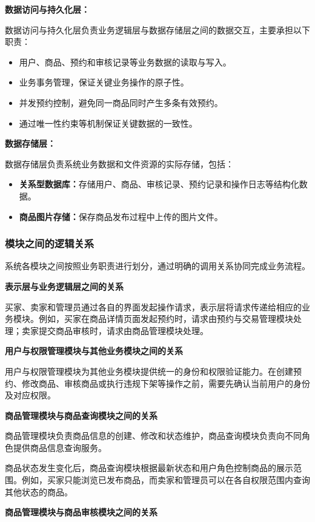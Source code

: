 \documentclass[12pt,a4paper]{article}
\begin{document}
	\textbf{数据访问与持久化层：}
	
	数据访问与持久化层负责业务逻辑层与数据存储层之间的数据交互，主要承担以下职责：
	\begin{itemize}
		\item 用户、商品、预约和审核记录等业务数据的读取与写入。
		\item 业务事务管理，保证关键业务操作的原子性。
		\item 并发预约控制，避免同一商品同时产生多条有效预约。
		\item 通过唯一性约束等机制保证关键数据的一致性。
	\end{itemize}
	
	\textbf{数据存储层：}
	
	数据存储层负责系统业务数据和文件资源的实际存储，包括：
	\begin{itemize}
		\item \textbf{关系型数据库：}存储用户、商品、审核记录、预约记录和操作日志等结构化数据。
		\item \textbf{商品图片存储：}保存商品发布过程中上传的图片文件。
	\end{itemize}
	
	\subsubsection{模块之间的逻辑关系}
	
	系统各模块之间按照业务职责进行划分，通过明确的调用关系协同完成业务流程。
	
	\textbf{表示层与业务逻辑层之间的关系}
	
	买家、卖家和管理员通过各自的界面发起操作请求，表示层将请求传递给相应的业务模块。例如，买家在商品详情页面发起预约时，请求由预约与交易管理模块处理；卖家提交商品审核时，请求由商品管理模块处理。
	
	\textbf{用户与权限管理模块与其他业务模块之间的关系}
	
	用户与权限管理模块为其他业务模块提供统一的身份和权限验证能力。在创建预约、修改商品、审核商品或执行违规下架等操作之前，需要先确认当前用户的身份及对应权限。
	
	\textbf{商品管理模块与商品查询模块之间的关系}
	
	商品管理模块负责商品信息的创建、修改和状态维护，商品查询模块负责向不同角色提供商品信息查询服务。
	
	商品状态发生变化后，商品查询模块根据最新状态和用户角色控制商品的展示范围。例如，买家只能浏览已发布商品，而卖家和管理员可以在各自权限范围内查询其他状态的商品。
	
	\textbf{商品管理模块与商品审核模块之间的关系}
	
\end{document}
